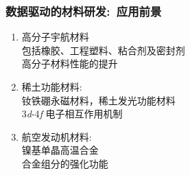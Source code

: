 \begin{frame}
	\frametitle{数据驱动的材料研发:~应用前景}
	\begin{enumerate}
		\item 高分子宇航材料\\
	包括橡胶、工程塑料、粘合剂及密封剂\\
	高分子材料性能的提升

		\item 稀土功能材料:\\
	钕铁硼永磁材料，稀土发光功能材料\\
	3\textit{d}-4\textit{f} 电子相互作用机制

		\item 航空发动机材料:\\
	镍基单晶高温合金\\
	合金组分的强化功能

	\end{enumerate}
\end{frame}
